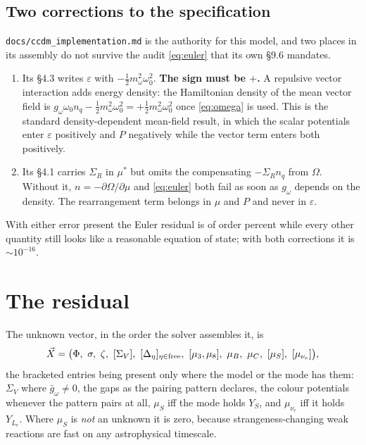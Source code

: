 \documentclass[11pt,a4paper]{article}
\newcommand{\mustar}{\mu^{*}}
\newcommand{\code}[1]{\texttt{#1}}
\begin{document}
\subsection{Two corrections to the specification}
\label{sec:corrections}

\code{docs/ccdm\_implementation.md} is the authority for this model, and two
places in its assembly do not survive the audit \eqref{eq:euler} that its own
\S9.6 mandates.

\begin{enumerate}
\item Its \S4.3 writes $\varepsilon$ with $-\tfrac12 m_\omega^2\omega_0^2$.
\textbf{The sign must be $+$.} A repulsive vector interaction adds energy
density: the Hamiltonian density of the mean vector field is
$g_\omega\omega_0 n_q - \tfrac12 m_\omega^2\omega_0^2 = +\tfrac12
m_\omega^2\omega_0^2$ once \eqref{eq:omega} is used. This is the standard
density-dependent mean-field result, in which the scalar potentials enter
$\varepsilon$ positively and $P$ negatively while the vector term enters both
positively.

\item Its \S4.1 carries $\Sigma_R$ in $\mustar$ but omits the compensating
$-\Sigma_R n_q$ from $\Omega$. Without it, $n=-\partial\Omega/\partial\mu$ and
\eqref{eq:euler} both fail as soon as $g_\omega$ depends on the density. The
rearrangement term belongs in $\mu$ and $P$ and never in $\varepsilon$.
\end{enumerate}

With either error present the Euler residual is of order percent while every
other quantity still looks like a reasonable equation of state; with both
corrections it is $\sim10^{-16}$.

\section{The residual}
\label{sec:residual}

The unknown vector, in the order the solver assembles it, is
\begin{equation}
\vec X = \bigl(\Phi,\ \sigma,\ \zeta,\ [\Sigma_V],\
 [\Delta_\eta]_{\eta\in\rm free},\ [\mu_3,\mu_8],\
 \mu_B,\ \mu_C,\ [\mu_S],\ [\mu_{\nu_e}]\bigr),
\label{eq:unknowns}
\end{equation}
the bracketed entries being present only where the model or the mode has them:
$\Sigma_V$ where $\bar g_\omega\neq0$, the gaps as the pairing pattern
declares, the colour potentials whenever the pattern pairs at all, $\mu_S$ iff
the mode holds $Y_S$, and $\mu_{\nu_e}$ iff it holds $Y_{L_e}$. Where $\mu_S$
is \emph{not} an unknown it is zero, because strangeness-changing weak
reactions are fast on any astrophysical timescale.
\end{document}
